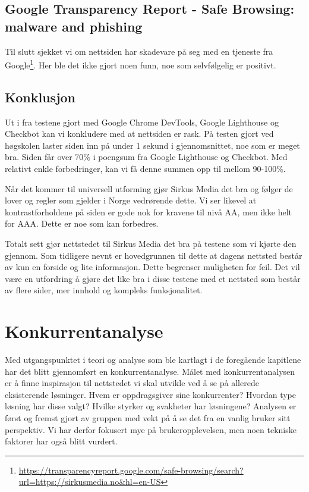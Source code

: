 \subsection{Google Transparency Report - Safe Browsing: malware and phishing}
Til slutt sjekket vi om nettsiden har skadevare på seg med en tjeneste fra Google\footnote{\url{https://transparencyreport.google.com/safe-browsing/search?url=https://sirkusmedia.no&hl=en-US}}. Her ble det ikke gjort noen funn, noe som selvfølgelig er positivt.

\subsection{Konklusjon}
Ut i fra testene gjort med Google Chrome DevTools, Google Lighthouse og Checkbot kan vi konkludere med at nettsiden er rask. På testen gjort ved høgskolen laster siden inn på under 1 sekund i gjennomsnittet, noe som er meget bra. Siden får over 70\% i poengsum fra Google Lighthouse og Checkbot. Med relativt enkle forbedringer, kan vi få denne summen opp til mellom 90-100\%.

Når det kommer til universell utforming gjør Sirkus Media det bra og følger de lover og regler som gjelder i Norge vedrørende dette. Vi ser likevel at kontrastforholdene på siden er gode nok for kravene til nivå AA, men ikke helt for AAA. Dette er noe som kan forbedres.

Totalt sett gjør nettstedet til Sirkus Media det bra på testene som vi kjørte den gjennom. Som tidligere nevnt er hovedgrunnen til dette at dagens nettsted består av kun en forside og lite informasjon. Dette begrenser muligheten for feil. Det vil være en utfordring å gjøre det like bra i disse testene med et nettsted som består av flere sider, mer innhold og kompleks funksjonalitet.

\section{Konkurrentanalyse}

Med utgangspunktet i teori og analyse som ble kartlagt i de foregående kapitlene har det blitt gjennomført en konkurrentanalyse. Målet med konkurrentanalysen er å finne inspirasjon til nettstedet vi skal utvikle ved å se på allerede eksisterende løsninger. Hvem er oppdragsgiver sine konkurrenter? Hvordan type løsning har disse valgt? Hvilke styrker og svakheter har løsningene? Analysen er først og fremst gjort av gruppen med vekt på å se det fra en vanlig bruker sitt perspektiv. Vi har derfor fokusert mye på brukeropplevelsen, men noen tekniske faktorer har også blitt vurdert.

